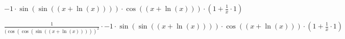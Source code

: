 \documentclass[a4paper,12pt]{article}
\begin{document}
\begin{center}
\begin{math}

-1 \cdot \sin(\sin((x + \ln(x)))) \cdot \cos((x + \ln(x))) \cdot (1 +  \frac{1 }{ x }  \cdot 1)

\end{math}
\end{center}



\begin{center}
\begin{math}

 \frac{1 }{ (\cos(\cos(\sin((x + \ln(x)))))^{2} }  \cdot -1 \cdot \sin(\sin((x + \ln(x)))) \cdot \cos((x + \ln(x))) \cdot (1 +  \frac{1 }{ x }  \cdot 1)

\end{math}
\end{center}
\end{document}
